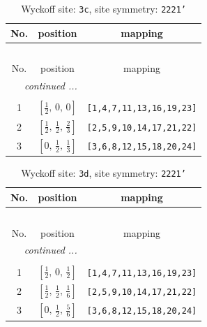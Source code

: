 \documentclass[fleqn,8pt]{jsarticle}
\begin{document}
\renewcommand{\arraystretch}{1.2}
\begin{longtable}{ccc}
\caption{Wyckoff site: {\tt 3c}, site symmetry: {\tt 2221'}}
 \\
 \hline \hline
No. & position & mapping \\ \hline \endfirsthead

\multicolumn{2}{l}{\tablename\ \thetable{}} \\
 \hline \hline
No. & position & mapping \\ \hline \endhead

 \hline \hline
\multicolumn{2}{r}{\footnotesize\it continued ...} \\ \endfoot

 \hline \hline
\multicolumn{2}{r}{} \\ \endlastfoot

1 & $\left[ \frac{1}{2},\, 0,\, 0 \right]$ & {\tt [1,4,7,11,13,16,19,23]} \\ \hline
2 & $\left[ \frac{1}{2},\, \frac{1}{2},\, \frac{2}{3} \right]$ & {\tt [2,5,9,10,14,17,21,22]} \\ \hline
3 & $\left[ 0,\, \frac{1}{2},\, \frac{1}{3} \right]$ & {\tt [3,6,8,12,15,18,20,24]} \\
\end{longtable}
\renewcommand{\arraystretch}{1.2}
\begin{longtable}{ccc}
\caption{Wyckoff site: {\tt 3d}, site symmetry: {\tt 2221'}}
 \\
 \hline \hline
No. & position & mapping \\ \hline \endfirsthead

\multicolumn{2}{l}{\tablename\ \thetable{}} \\
 \hline \hline
No. & position & mapping \\ \hline \endhead

 \hline \hline
\multicolumn{2}{r}{\footnotesize\it continued ...} \\ \endfoot

 \hline \hline
\multicolumn{2}{r}{} \\ \endlastfoot

1 & $\left[ \frac{1}{2},\, 0,\, \frac{1}{2} \right]$ & {\tt [1,4,7,11,13,16,19,23]} \\ \hline
2 & $\left[ \frac{1}{2},\, \frac{1}{2},\, \frac{1}{6} \right]$ & {\tt [2,5,9,10,14,17,21,22]} \\ \hline
3 & $\left[ 0,\, \frac{1}{2},\, \frac{5}{6} \right]$ & {\tt [3,6,8,12,15,18,20,24]} \\
\end{longtable}
\end{document}
